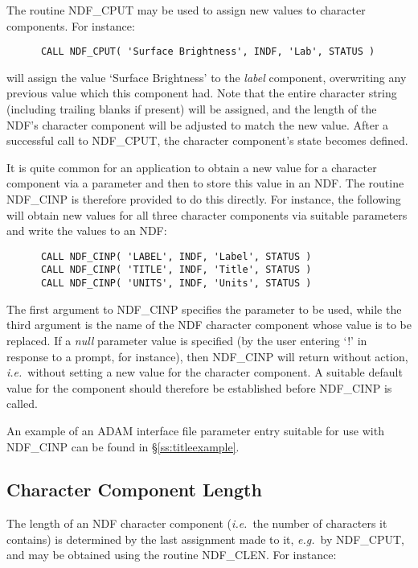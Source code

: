 \documentclass[twoside,11pt]{article}
\newcommand{\htmlref}[2]{#1}
\newcommand{\xref}[3]{#1}
\newcommand{\xlabel}[1]{}
\newcommand{\st}[1]{{\em{#1}}}
\begin{document}
The routine \htmlref{NDF\_CPUT}{NDF_CPUT} may be used to assign new values to character
components. 
For instance:

\small
\begin{verbatim}
      CALL NDF_CPUT( 'Surface Brightness', INDF, 'Lab', STATUS )
\end{verbatim}
\normalsize

will assign the value `Surface Brightness' to the \st{label\/} component, 
overwriting any previous value which this component had.
Note that the entire character string (including trailing blanks if present)
will be assigned, and the length of the NDF's character component will be
adjusted to match the new value. 
After a successful call to NDF\_CPUT, the character component's state 
becomes defined.

It is quite common for an application to obtain a new value for a
character component via a parameter and then to store this value in an
NDF.
The routine \htmlref{NDF\_CINP}{NDF_CINP} is therefore provided to do this directly.  For
instance, the following will obtain new values for all three character
components via suitable parameters and write the values to an NDF:

\small
\begin{verbatim}
      CALL NDF_CINP( 'LABEL', INDF, 'Label', STATUS )
      CALL NDF_CINP( 'TITLE', INDF, 'Title', STATUS )
      CALL NDF_CINP( 'UNITS', INDF, 'Units', STATUS )
\end{verbatim}
\normalsize

The first argument to NDF\_CINP specifies the parameter to be used, while
the third argument is the name of the NDF character component whose value is to
be replaced. 
If a \st{null\/} parameter value is specified (by the user entering `!' in
response to a prompt, for instance), then NDF\_CINP will return without
action, \st{i.e.}\ without setting a new value for the character component. 
A suitable default value for the component should therefore be established
before NDF\_CINP is called. 

An example of an \xref{ADAM}{sg4}{} interface file parameter entry
suitable for use with
NDF\_CINP can be found in \S\ref{ss:titleexample}.

\subsection{\xlabel{character_component_length}Character Component Length}

The length of an NDF character component (\st{i.e.}\ the number of
characters it contains) is determined by the last assignment made to it,
\st{e.g.}\ by \htmlref{NDF\_CPUT}{NDF_CPUT}, and may be obtained using the routine \htmlref{NDF\_CLEN}{NDF_CLEN}. 
For instance:
\end{document}
